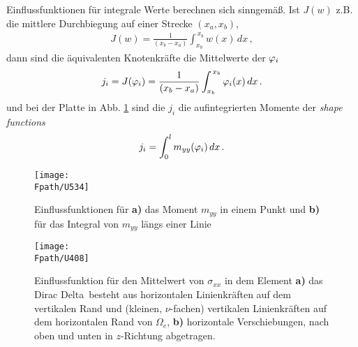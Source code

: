 Einflussfunktionen f\"{u}r integrale Werte berechnen sich sinngem\"{a}{\ss}. Ist $J(w)$ z.B. die mittlere Durchbiegung auf einer Strecke $(x_a, x_b)$,
\begin{align}
J(w) = \frac{1}{(x_b - x_a)}\int_{x_b}^{\, x_b} w(x)\,dx\,,
\end{align}
dann sind die \"{a}quivalenten Knotenkr\"{a}fte die Mittelwerte der $\varphi_i$
\begin{align}
j_i = J(\varphi_i) = \frac{1}{(x_b - x_a)} \int_{x_b}^{\, x_b}  \varphi_i(x)\,dx\,.
\end{align}
und bei der Platte in Abb. \ref{U534} sind die $j_i$ die aufintegrierten Momente der {\em shape functions\/}
\begin{align}
j_i = \int_{0}^{l} m_{yy}(\varphi_i)\,dx\,.
\end{align}

\begin{figure}[tbp]
\centering
\if {} \sidecaption \fi
\texttt{[image: \\Fpath/U534]}
\caption{Einflussfunktionen f\"{u}r {\bf a)} das Moment $m_{yy}$ in einem Punkt und {\bf b)} f\"{u}r das Integral von $m_{yy}$ l\"{a}ngs einer Linie} \label{U534}
\end{figure}%


\begin{figure}[tbp]
\centering
\if {} \sidecaption \fi
\texttt{[image: \\Fpath/U408]}
\caption{Einflussfunktion f\"{u}r den Mittelwert von $\sigma_{xx}$ in dem Element {\bf a)\/} das \lqq Dirac Delta\rqq \, besteht aus horizontalen Linienkr\"{a}ften auf dem vertikalen Rand und (kleinen, $\nu$-fachen) vertikalen Linienkr\"{a}ften auf dem horizontalen Rand von $\Omega_e$, {\bf b)\/}
horizontale Verschiebungen, nach oben und unten in $z$-Richtung abgetragen. } \label{Average}
\end{figure}%

